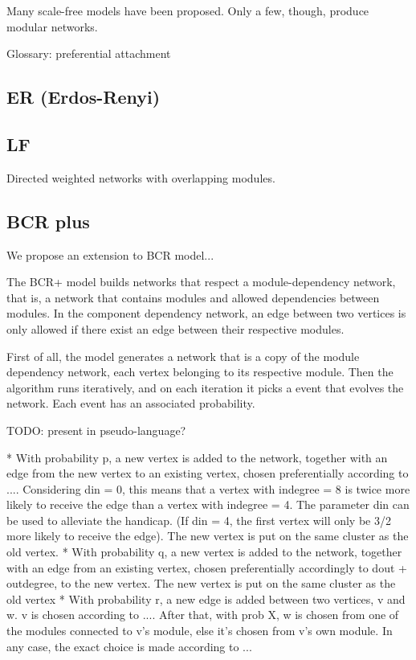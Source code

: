 Many scale-free models have been proposed. Only a few, though, produce modular
networks. 

Glossary: preferential attachment

\subsection{ER (Erdos-Renyi)}

\subsection{LF}

Directed weighted networks with overlapping modules.

\subsection{BCR plus}

We propose an extension to BCR model...

The BCR+ model builds networks that respect a module-dependency network, that
is, a network that contains modules and allowed dependencies between modules. 
In the component dependency network, an edge between two vertices is only
allowed if there exist an edge between their respective modules.

First of all, the model generates a network that is a copy of the module
dependency network, each vertex belonging to its respective module. Then the
algorithm runs iteratively, and on each iteration it picks a event that evolves
the network. Each event has an associated probability.

TODO: present in pseudo-language?

* With probability p, a new vertex is added to the network, together with an
edge from the new vertex to an existing vertex, chosen preferentially according
to .... Considering din = 0, this means that a vertex with indegree = 8 is
twice more likely to receive the edge than a vertex with indegree = 4. The
parameter din can be used to alleviate the handicap. (If din = 4, the first
vertex will only be 3/2 more likely to receive the edge). The new vertex is
put on the same cluster as the old vertex.
* With probability q, a new vertex is added to the network, together with an
edge from an existing vertex, chosen preferentially accordingly to dout +
outdegree, to the new vertex. The new vertex is put on the same cluster as the
old vertex
* With probability r, a new edge is added between two vertices, v and w. v is
chosen according to .... After that, with prob X, w is chosen from one of the
modules connected to v's module, else it's chosen from v's own module. In any
case, the exact choice is made according to ...

